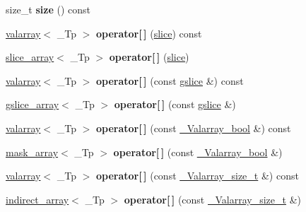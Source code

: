 \begin{DoxyCompactItemize}
size\+\_\+t {\bfseries size} () const
\item 
\mbox{\label{classvalarray_a3bdb804c105466307cadf1ec6b3800ab}} 
\hyperlink{classvalarray}{valarray}$<$ \+\_\+\+Tp $>$ {\bfseries operator\mbox{[}$\,$\mbox{]}} (\hyperlink{classslice}{slice}) const
\item 
\mbox{\label{classvalarray_ae8b5bd6df13ad2c2b50fae4412c0fe35}} 
\hyperlink{classslice__array}{slice\+\_\+array}$<$ \+\_\+\+Tp $>$ {\bfseries operator\mbox{[}$\,$\mbox{]}} (\hyperlink{classslice}{slice})
\item 
\mbox{\label{classvalarray_a316f9be6e6a29495c7eb649a8fd41926}} 
\hyperlink{classvalarray}{valarray}$<$ \+\_\+\+Tp $>$ {\bfseries operator\mbox{[}$\,$\mbox{]}} (const \hyperlink{classgslice}{gslice} \&) const
\item 
\mbox{\label{classvalarray_a405b350c947f3a8b4e55c75c964a8cfa}} 
\hyperlink{classgslice__array}{gslice\+\_\+array}$<$ \+\_\+\+Tp $>$ {\bfseries operator\mbox{[}$\,$\mbox{]}} (const \hyperlink{classgslice}{gslice} \&)
\item 
\mbox{\label{classvalarray_a2bfc8d54e8dd37da4a80cd7418a6a275}} 
\hyperlink{classvalarray}{valarray}$<$ \+\_\+\+Tp $>$ {\bfseries operator\mbox{[}$\,$\mbox{]}} (const \hyperlink{classvalarray}{\+\_\+\+Valarray\+\_\+bool} \&) const
\item 
\mbox{\label{classvalarray_a2abe23032d5aaa65f64beead9e767327}} 
\hyperlink{classmask__array}{mask\+\_\+array}$<$ \+\_\+\+Tp $>$ {\bfseries operator\mbox{[}$\,$\mbox{]}} (const \hyperlink{classvalarray}{\+\_\+\+Valarray\+\_\+bool} \&)
\item 
\mbox{\label{classvalarray_a2fba26e557cec8ac929fc605af006aee}} 
\hyperlink{classvalarray}{valarray}$<$ \+\_\+\+Tp $>$ {\bfseries operator\mbox{[}$\,$\mbox{]}} (const \hyperlink{classvalarray}{\+\_\+\+Valarray\+\_\+size\+\_\+t} \&) const
\item 
\mbox{\label{classvalarray_a53e8c60c08ab40c87d2d102419fbedf4}} 
\hyperlink{classindirect__array}{indirect\+\_\+array}$<$ \+\_\+\+Tp $>$ {\bfseries operator\mbox{[}$\,$\mbox{]}} (const \hyperlink{classvalarray}{\+\_\+\+Valarray\+\_\+size\+\_\+t} \&)

\end{DoxyCompactItemize}
